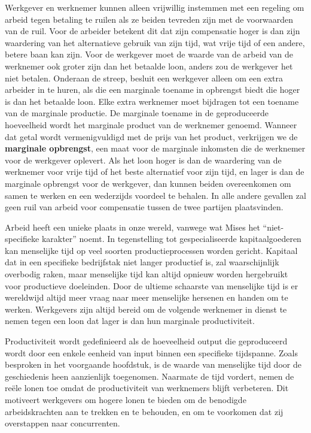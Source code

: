 Werkgever en werknemer kunnen alleen vrijwillig instemmen met een
regeling om arbeid tegen betaling te ruilen als ze beiden tevreden zijn
met de voorwaarden van de ruil. Voor de arbeider betekent dit dat zijn
compensatie hoger is dan zijn waardering van het alternatieve gebruik
van zijn tijd, wat vrije tijd of een andere, betere baan kan zijn. Voor
de werkgever moet de waarde van de arbeid van de werknemer ook groter
zijn dan het betaalde loon, anders zou de werkgever het niet betalen.
Onderaan de streep, besluit een werkgever alleen om een extra arbeider
in te huren, als die een marginale toename in opbrengst biedt die hoger
is dan het betaalde loon. Elke extra werknemer moet bijdragen tot een
toename van de marginale productie. De marginale toename in de
geproduceerde hoeveelheid wordt het marginale product van de werknemer
genoemd. Wanneer dat getal wordt vermenigvuldigd met de prijs van het
product, verkrijgen we de \textbf{marginale opbrengst}, een maat voor de
marginale inkomsten die de werknemer voor de werkgever oplevert. Als het
loon hoger is dan de waardering van de werknemer voor vrije tijd of het
beste alternatief voor zijn tijd, en lager is dan de marginale opbrengst
voor de werkgever, dan kunnen beiden overeenkomen om samen te werken en
een wederzijds voordeel te behalen. In alle andere gevallen zal geen
ruil van arbeid voor compensatie tussen de twee partijen plaatsvinden.

Arbeid heeft een unieke plaats in onze wereld, vanwege wat Mises het
\enquote{niet-specifieke karakter} noemt.\autocite{41} In tegenstelling tot gespecialiseerde
kapitaalgoederen kan menselijke tijd op veel soorten
productieprocessen worden gericht. Kapitaal dat in een specifieke
bedrijfstak niet langer productief is, zal waarschijnlijk
overbodig raken, maar menselijke tijd kan altijd opnieuw worden
hergebruikt voor productieve doeleinden. Door de ultieme schaarste van
menselijke tijd is er wereldwijd altijd meer vraag naar meer menselijke
hersenen en handen om te werken. Werkgevers zijn altijd bereid
om de volgende werknemer in dienst te nemen tegen een loon dat lager is
dan hun marginale productiviteit.

Productiviteit wordt gedefinieerd als de hoeveelheid output die geproduceerd wordt door een enkele eenheid van input binnen een specifieke tijdspanne. Zoals besproken in het voorgaande hoofdstuk, is de waarde van menselijke tijd door de geschiedenis heen aanzienlijk toegenomen. Naarmate de tijd vordert, nemen de reële lonen toe omdat de productiviteit van werknemers blijft verbeteren. Dit motiveert werkgevers om hogere lonen te bieden om de benodigde arbeidskrachten aan te trekken en te behouden, en om te voorkomen dat zij overstappen naar concurrenten.

